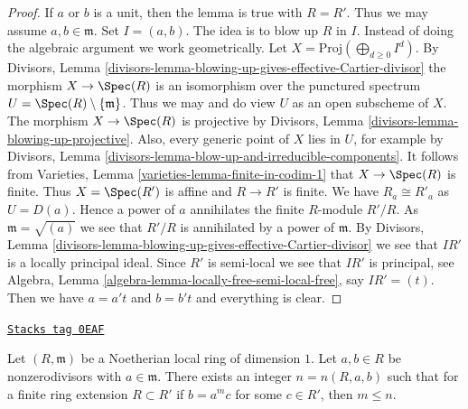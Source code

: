 \begin{proof}
If $a$ or $b$ is a unit, then the lemma is true with $R = R'$.
Thus we may assume $a, b \in \mathfrak m$.
Set $I = (a, b)$. The idea is to blow up $R$ in $I$.
Instead of doing the algebraic argument we work geometrically.
Let $X = \text{Proj}(\bigoplus_{d \geq 0} I^d)$.
By Divisors, Lemma
\ref{divisors-lemma-blowing-up-gives-effective-Cartier-divisor}
the morphism $X \to \Spec(R)$ is an isomorphism over
the punctured spectrum $U = \Spec(R) \setminus \{\mathfrak m\}$.
Thus we may and do view $U$ as an open subscheme of $X$.
The morphism $X \to \Spec(R)$ is projective by
Divisors, Lemma \ref{divisors-lemma-blowing-up-projective}.
Also, every generic point of $X$ lies in $U$, for example
by Divisors, Lemma \ref{divisors-lemma-blow-up-and-irreducible-components}.
It follows from Varieties, Lemma \ref{varieties-lemma-finite-in-codim-1}
that $X \to \Spec(R)$ is finite. Thus $X = \Spec(R')$ is
affine and $R \to R'$ is finite. We have $R_a \cong R'_a$ as $U = D(a)$.
Hence a power of $a$ annihilates the finite $R$-module $R'/R$.
As $\mathfrak m = \sqrt{(a)}$ we see that $R'/R$ is annihilated
by a power of $\mathfrak m$. By
Divisors, Lemma \ref{divisors-lemma-blowing-up-gives-effective-Cartier-divisor}
we see that $IR'$ is a locally principal ideal.
Since $R'$ is semi-local we see that $IR'$ is principal,
see Algebra, Lemma \ref{algebra-lemma-locally-free-semi-local-free},
say $IR' = (t)$. Then we have $a = a't$ and $b = b't$ and everything is
clear.
\end{proof}

\begin{lemma}
\label{chow-lemma-not-infinitely-divisible}
\href{https://stacks.math.columbia.edu/tag/0EAF}{\texttt{Stacks tag 0EAF}}

Let $(R, \mathfrak m)$ be a Noetherian local ring of dimension $1$.
Let $a, b \in R$ be nonzerodivisors with $a \in \mathfrak m$.
There exists an integer $n = n(R, a, b)$ such that for a finite ring
extension $R \subset R'$ if $b = a^m c$ for some $c \in R'$, then $m \leq n$.
\end{lemma}

